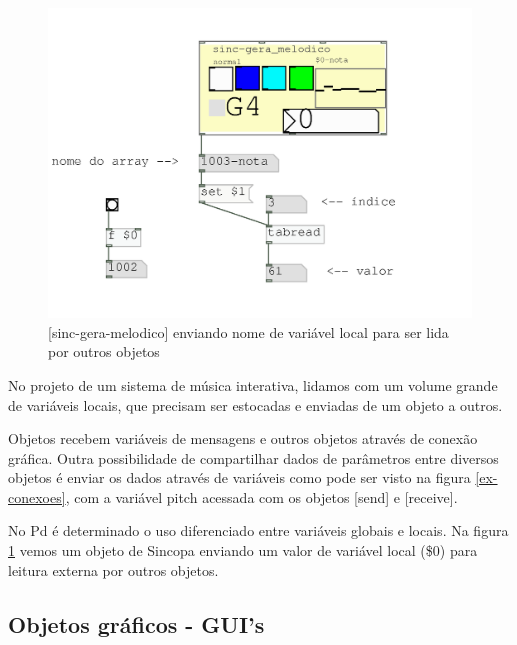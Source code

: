 \documentclass[draft]{ppgmus}
\begin{document}
\begin{figure}
\includegraphics[scale=.6]{ex-variaveis}
\caption{[sinc-gera-melodico] enviando nome de variável local para ser lida por outros objetos}
\label{ex-variaveis}
\end{figure}

No projeto de um sistema de música interativa, lidamos com um volume grande
de variáveis locais, que precisam ser estocadas e enviadas de um objeto a outros.

Objetos recebem variáveis de mensagens e outros objetos através de conexão
gráfica. Outra possibilidade de compartilhar dados de parâmetros entre diversos
objetos é enviar os dados através de variáveis como pode ser visto na figura \ref{ex-conexoes},
com a variável pitch acessada com os objetos [send] e [receive].

No Pd é determinado o uso diferenciado entre variáveis globais e locais.
Na figura \ref{ex-variaveis} vemos um objeto de Sincopa enviando um valor de 
variável local (\$0) para leitura externa por outros objetos.



\subsection{Objetos gráficos - GUI's}

\end{document}
